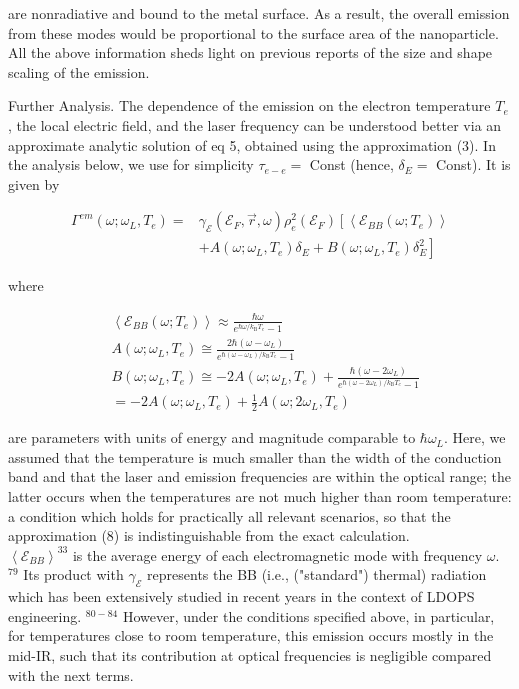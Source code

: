 \documentclass[10pt]{article}
\begin{document}
are nonradiative and bound to the metal surface. As a result, the overall emission from these modes would be proportional to the surface area of the nanoparticle. All the above information sheds light on previous reports of the size and shape scaling of the emission.

Further Analysis. The dependence of the emission on the electron temperature $T_{e}$, the local electric field, and the laser frequency can be understood better via an approximate analytic solution of eq 5, obtained using the approximation (3). In the analysis below, we use for simplicity $\tau_{e-e}=$ Const (hence, $\delta_{E}=$ Const). It is given by


\begin{align*}
\Gamma^{e m}\left(\omega ; \omega_{L}, T_{e}\right)= & \gamma_{\mathcal{E}}\left(\mathcal{E}_{F}, \vec{r}, \omega\right) \rho_{e}^{2}\left(\mathcal{E}_{F}\right)\left[\left\langle\mathcal{E}_{B B}\left(\omega ; T_{e}\right)\right\rangle\right. \\
& \left.+A\left(\omega ; \omega_{L}, T_{e}\right) \delta_{E}+B\left(\omega ; \omega_{L}, T_{e}\right) \delta_{E}^{2}\right] \tag{8}
\end{align*}


where


\begin{align*}
& \left\langle\mathcal{E}_{B B}\left(\omega ; T_{e}\right)\right\rangle \approx \frac{\hbar \omega}{e^{\hbar \omega / k_{\mathrm{B}} T_{e}}-1} \\
& A\left(\omega ; \omega_{L}, T_{e}\right) \cong \frac{2 \hbar\left(\omega-\omega_{L}\right)}{e^{\hbar\left(\omega-\omega_{L}\right) / k_{\mathrm{B}} T_{e}}-1} \\
& B\left(\omega ; \omega_{L}, T_{e}\right) \cong-2 A\left(\omega ; \omega_{L}, T_{e}\right)+\frac{\hbar\left(\omega-2 \omega_{L}\right)}{e^{\hbar\left(\omega-2 \omega_{L}\right) / k_{\mathrm{B}} T_{e}}-1} \\
& =-2 A\left(\omega ; \omega_{L}, T_{e}\right)+\frac{1}{2} A\left(\omega ; 2 \omega_{L}, T_{e}\right) \tag{9}
\end{align*}


are parameters with units of energy and magnitude comparable to $\hbar \omega_{L}$. Here, we assumed that the temperature is much smaller than the width of the conduction band and that the laser and emission frequencies are within the optical range; the latter occurs when the temperatures are not much higher than room temperature: a condition which holds for practically all relevant scenarios, so that the approximation (8) is indistinguishable from the exact calculation.\\
$\left\langle\mathcal{E}_{B B}\right\rangle^{33}$ is the average energy of each electromagnetic mode with frequency $\omega$. ${ }^{79}$ Its product with $\gamma_{\mathcal{E}}$ represents the BB (i.e., ("standard") thermal) radiation which has been extensively studied in recent years in the context of LDOPS engineering. ${ }^{80-84}$ However, under the conditions specified above, in particular, for temperatures close to room temperature, this emission occurs mostly in the mid-IR, such that its contribution at optical frequencies is negligible compared with the next terms.
\end{document}

